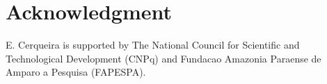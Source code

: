 \documentclass{sig-alternate-2013}
\begin{document}
\section*{Acknowledgment}
E. Cerqueira is supported by The National Council for Scientific and Technological Development (CNPq) and Fundacao Amazonia Paraense de Amparo a Pesquisa (FAPESPA).


%

%
%

\balancecolumns
\end{document}
